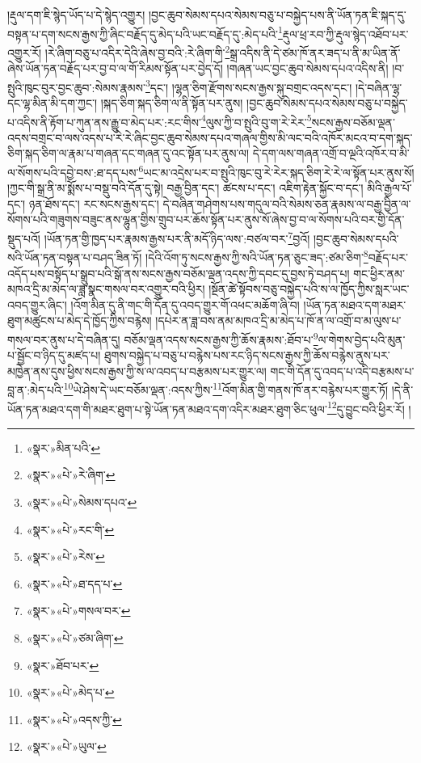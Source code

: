 །རྡུལ་དག་ཇི་སྙེད་ཡོད་པ་དེ་སྙེད་འགྱུར། །བྱང་ཆུབ་སེམས་དཔའ་སེམས་བཅུ་པ་བསྐྱེད་པས་ནི་ཡོན་ཏན་ཇི་སྐད་དུ་བསྟན་པ་དག་སངས་རྒྱས་ཀྱི་ཞིང་བརྗོད་དུ་མེད་པའི་ཡང་བརྗོད་དུ་:མེད་པའི་\footnote{«སྣར་»མིན་པའི་}རྡུལ་ཕྲ་རབ་ཀྱི་རྡུལ་སྙེད་འཐོབ་པར་འགྱུར་རོ། །རེ་ཞིག་བཅུ་པ་འདིར་དེའི་ཞེས་བྱ་བའི་:རེ་ཞིག་གི་\footnote{«སྣར་»«པེ་»རེ་ཞིག་}སྒྲ་འདིས་ནི་དེ་ཙམ་ཁོ་ནར་ཟད་པ་ནི་མ་ཡིན་ནོ་ཞེས་ཡོན་ཏན་བརྗོད་པར་བྱ་བ་ལ་གོ་རིམས་སྟོན་པར་བྱེད་དོ། །གཞན་ཡང་བྱང་ཆུབ་སེམས་དཔའ་འདིས་ནི། །བ་སྤུའི་ཁུང་བུར་བྱང་ཆུབ་:སེམས་རྣམས་\footnote{«སྣར་»«པེ་»སེམས་དཔའ་}དང་། །ལྷན་ཅིག་རྫོགས་སངས་རྒྱས་སྐུ་བགྲང་འདས་དང་། །དེ་བཞིན་ལྷ་དང་ལྷ་མིན་མི་དག་ཀྱང་། །སྐད་ཅིག་སྐད་ཅིག་ལ་ནི་སྟོན་པར་ནུས། །བྱང་ཆུབ་སེམས་དཔའ་སེམས་བཅུ་པ་བསྐྱེད་པ་འདིས་ནི་རྟོག་པ་ཀུན་ནས་རྒྱུ་བ་མེད་པར་:རང་གིས་\footnote{«སྣར་»«པེ་»རང་གི་}ལུས་ཀྱི་བ་སྤུའི་བུ་ག་རེ་རེར་\footnote{«སྣར་»«པེ་»རེས་}སངས་རྒྱས་བཅོམ་ལྡན་འདས་བགྲང་བ་ལས་འདས་པ་རེ་རེ་ཞིང་བྱང་ཆུབ་སེམས་དཔའ་གཞལ་གྱིས་མི་ལང་བའི་འཁོར་མངའ་བ་དག་སྐད་ཅིག་སྐད་ཅིག་ལ་རྣམ་པ་གཞན་དང་གཞན་དུ་འང་སྟོན་པར་ནུས་ལ། དེ་དག་ལས་གཞན་འགྲོ་བ་ལྔའི་འཁོར་བ་མི་ལ་སོགས་པའི་དབྱེ་བས་:ཐ་དད་པས་\footnote{«སྣར་»«པེ་»ཐ་དད་པ་}ཡང་མ་འདྲེས་པར་བ་སྤུའི་ཁུང་བུ་རེ་རེར་སྐད་ཅིག་རེ་རེ་ལ་སྟོན་པར་ནུས་སོ། །ཀྱང་གི་སྒྲ་ནི་མ་སྨོས་པ་བསྡུ་བའི་དོན་དུ་སྟེ། བརྒྱ་བྱིན་དང་། ཚངས་པ་དང་། འཇིག་རྟེན་སྐྱོང་བ་དང་། མིའི་རྒྱལ་པོ་དང་། ཉན་ཐོས་དང་། རང་སངས་རྒྱས་དང་། དེ་བཞིན་གཤེགས་པས་གདུལ་བའི་སེམས་ཅན་རྣམས་ལ་བརྒྱ་བྱིན་ལ་སོགས་པའི་གཟུགས་བཟུང་ནས་ལྷུན་གྱིས་གྲུབ་པར་ཆོས་སྟོན་པར་ནུས་སོ་ཞེས་བྱ་བ་ལ་སོགས་པའི་བར་གྱི་དོན་སྡུད་པའོ། །ཡོན་ཏན་གྱི་ཁྱད་པར་རྣམས་རྒྱས་པར་ནི་མདོ་ཉིད་ལས་:བཙལ་བར་\footnote{«སྣར་»«པེ་»གསལ་བར་}བྱའོ། །བྱང་ཆུབ་སེམས་དཔའི་སའི་ཡོན་ཏན་བསྟན་པ་བཤད་ཟིན་ཏོ། །དེའི་འོག་ཏུ་སངས་རྒྱས་ཀྱི་སའི་ཡོན་ཏན་ཅུང་ཟད་:ཙམ་ཅིག་\footnote{«སྣར་»«པེ་»ཙམ་ཞིག་}བརྗོད་པར་འདོད་པས་བསྟོད་པ་སྒྲུབ་པའི་སྒོ་ནས་སངས་རྒྱས་བཅོམ་ལྡན་འདས་ཀྱི་དབང་དུ་བྱས་ཏེ་བཤད་པ། གང་ཕྱིར་ནམ་མཁའ་དྲི་མ་མེད་ལ་ཟླ་སྣང་གསལ་བར་འགྱུར་བའི་ཕྱིར། །སྔོན་ཚེ་སྟོབས་བཅུ་བསྐྱེད་པའི་ས་ལ་ཁྱོད་ཀྱིས་སླར་ཡང་འབད་གྱུར་ཞིང་། །འོག་མིན་དུ་ནི་གང་གི་དོན་དུ་འབད་གྱུར་གོ་འཕང་མཆོག་ཞི་བ། །ཡོན་ཏན་མཐའ་དག་མཐར་ཐུག་མཚུངས་པ་མེད་དེ་ཁྱོད་ཀྱིས་བརྙེས། །དཔེར་ན་ཟླ་བས་ནམ་མཁའ་དྲི་མ་མེད་པ་ཁོ་ན་ལ་འགྲོ་བ་མ་ལུས་པ་གསལ་བར་ནུས་པ་དེ་བཞིན་དུ། བཅོམ་ལྡན་འདས་སངས་རྒྱས་ཀྱི་ཆོས་རྣམས་:ཐོབ་པ་\footnote{«སྣར་»ཐོབ་པར་}ལ་གེགས་བྱེད་པའི་མུན་པ་སྦྱོང་བ་ཉིད་དུ་མཛད་པ། ཐུགས་བསྐྱེད་པ་བཅུ་པ་བརྙེས་པས་རང་ཉིད་སངས་རྒྱས་ཀྱི་ཆོས་བརྙེས་ནུས་པར་མཁྱེན་ནས་དུས་ཕྱིས་སངས་རྒྱས་ཀྱི་ས་ལ་འབད་པ་བརྩམས་པར་གྱུར་ལ། གང་གི་དོན་དུ་འབད་པ་འདི་བརྩམས་པ་བླ་ན་:མེད་པའི་\footnote{«སྣར་»«པེ་»མེད་པ་}ཡེ་ཤེས་དེ་ཡང་བཅོམ་ལྡན་:འདས་ཀྱིས་\footnote{«སྣར་»«པེ་»འདས་ཀྱི་}འོག་མིན་གྱི་གནས་ཁོ་ནར་བརྙེས་པར་གྱུར་ཏོ། །དེ་ནི་ཡོན་ཏན་མཐའ་དག་གི་མཐར་ཐུག་པ་སྟེ་ཡོན་ཏན་མཐའ་དག་འདིར་མཐར་ཐུག་ཅིང་ཕུལ་\footnote{«སྣར་»«པེ་»ཡུལ་}དུ་བྱུང་བའི་ཕྱིར་རོ། །
